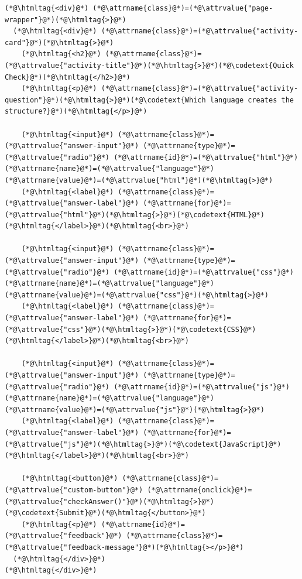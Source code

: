 \documentclass{article}
\begin{document}
{\begin{lstlisting}
(*@\htmltag{<div}@*) (*@\attrname{class}@*)=(*@\attrvalue{"page-wrapper"}@*)(*@\htmltag{>}@*)
  (*@\htmltag{<div}@*) (*@\attrname{class}@*)=(*@\attrvalue{"activity-card"}@*)(*@\htmltag{>}@*)
    (*@\htmltag{<h2}@*) (*@\attrname{class}@*)=(*@\attrvalue{"activity-title"}@*)(*@\htmltag{>}@*)(*@\codetext{Quick Check}@*)(*@\htmltag{</h2>}@*)
    (*@\htmltag{<p}@*) (*@\attrname{class}@*)=(*@\attrvalue{"activity-question"}@*)(*@\htmltag{>}@*)(*@\codetext{Which language creates the structure?}@*)(*@\htmltag{</p>}@*)

    (*@\htmltag{<input}@*) (*@\attrname{class}@*)=(*@\attrvalue{"answer-input"}@*) (*@\attrname{type}@*)=(*@\attrvalue{"radio"}@*) (*@\attrname{id}@*)=(*@\attrvalue{"html"}@*) (*@\attrname{name}@*)=(*@\attrvalue{"language"}@*) (*@\attrname{value}@*)=(*@\attrvalue{"html"}@*)(*@\htmltag{>}@*)
    (*@\htmltag{<label}@*) (*@\attrname{class}@*)=(*@\attrvalue{"answer-label"}@*) (*@\attrname{for}@*)=(*@\attrvalue{"html"}@*)(*@\htmltag{>}@*)(*@\codetext{HTML}@*)(*@\htmltag{</label>}@*)(*@\htmltag{<br>}@*)

    (*@\htmltag{<input}@*) (*@\attrname{class}@*)=(*@\attrvalue{"answer-input"}@*) (*@\attrname{type}@*)=(*@\attrvalue{"radio"}@*) (*@\attrname{id}@*)=(*@\attrvalue{"css"}@*) (*@\attrname{name}@*)=(*@\attrvalue{"language"}@*) (*@\attrname{value}@*)=(*@\attrvalue{"css"}@*)(*@\htmltag{>}@*)
    (*@\htmltag{<label}@*) (*@\attrname{class}@*)=(*@\attrvalue{"answer-label"}@*) (*@\attrname{for}@*)=(*@\attrvalue{"css"}@*)(*@\htmltag{>}@*)(*@\codetext{CSS}@*)(*@\htmltag{</label>}@*)(*@\htmltag{<br>}@*)

    (*@\htmltag{<input}@*) (*@\attrname{class}@*)=(*@\attrvalue{"answer-input"}@*) (*@\attrname{type}@*)=(*@\attrvalue{"radio"}@*) (*@\attrname{id}@*)=(*@\attrvalue{"js"}@*) (*@\attrname{name}@*)=(*@\attrvalue{"language"}@*) (*@\attrname{value}@*)=(*@\attrvalue{"js"}@*)(*@\htmltag{>}@*)
    (*@\htmltag{<label}@*) (*@\attrname{class}@*)=(*@\attrvalue{"answer-label"}@*) (*@\attrname{for}@*)=(*@\attrvalue{"js"}@*)(*@\htmltag{>}@*)(*@\codetext{JavaScript}@*)(*@\htmltag{</label>}@*)(*@\htmltag{<br>}@*)

    (*@\htmltag{<button}@*) (*@\attrname{class}@*)=(*@\attrvalue{"custom-button"}@*) (*@\attrname{onclick}@*)=(*@\attrvalue{"checkAnswer()"}@*)(*@\htmltag{>}@*)(*@\codetext{Submit}@*)(*@\htmltag{</button>}@*)
    (*@\htmltag{<p}@*) (*@\attrname{id}@*)=(*@\attrvalue{"feedback"}@*) (*@\attrname{class}@*)=(*@\attrvalue{"feedback-message"}@*)(*@\htmltag{></p>}@*)
  (*@\htmltag{</div>}@*)
(*@\htmltag{</div>}@*)


\end{lstlisting}}
\end{document}
